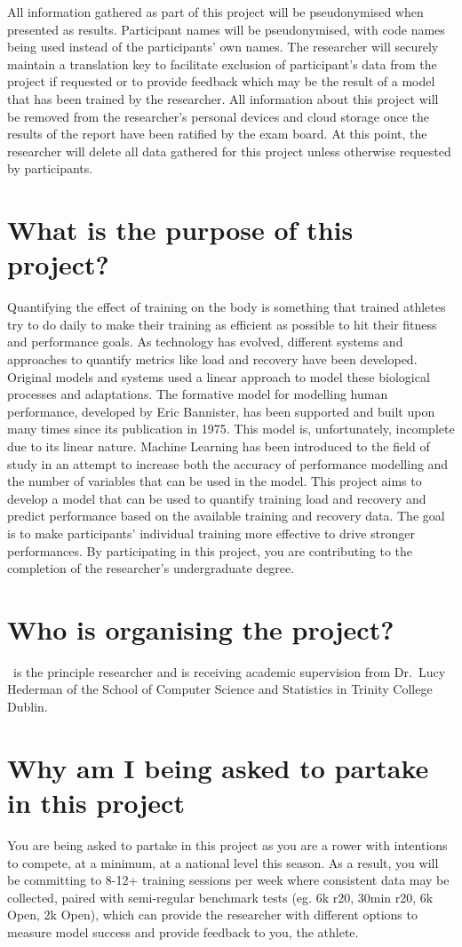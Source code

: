 All information gathered as part of this project will be pseudonymised when presented as results. Participant names will be pseudonymised, with code names being used instead of the participants' own names. The researcher will securely maintain a translation key to facilitate exclusion of participant's data from the project if requested or to provide feedback which may be the result of a model that has been trained by the researcher. All information about this project will be removed from the researcher's personal devices and cloud storage once the results of the report have been ratified by the exam board. At this point, the researcher will delete all data gathered for this project unless otherwise requested by participants.

\section*{What is the purpose of this project?}
Quantifying the effect of training on the body is something that trained athletes try to do daily to make their training as efficient as possible to hit their fitness and performance goals. As technology has evolved, different systems and approaches to quantify metrics like load and recovery have been developed. Original models and systems used a linear approach to model these biological processes and adaptations. The formative model for modelling human performance, developed by Eric Bannister, has been supported and built upon many times since its publication in 1975. This model is, unfortunately, incomplete due to its linear nature. Machine Learning has been introduced to the field of study in an attempt to increase both the accuracy of performance modelling and the number of variables that can be used in the model. This project aims to develop a model that can be used to quantify training load and recovery and predict performance based on the available training and recovery data. The goal is to make participants' individual training more effective to drive stronger performances.
By participating in this project, you are contributing to the completion of the researcher's undergraduate degree.
\section*{Who is organising the project?}
\authorname~is the principle researcher and is receiving academic supervision from Dr.~Lucy Hederman of the School of Computer Science and Statistics in Trinity College Dublin.
\section*{Why am I being asked to partake in this project}
You are being asked to partake in this project as you are a rower with intentions to compete, at a minimum, at a national level this season. As a result, you will be committing to 8-12+ training sessions per week where consistent data may be collected, paired with semi-regular benchmark tests (eg. 6k r20, 30min r20, 6k Open, 2k Open), which can provide the researcher with different options to measure model success and provide feedback to you, the athlete.
